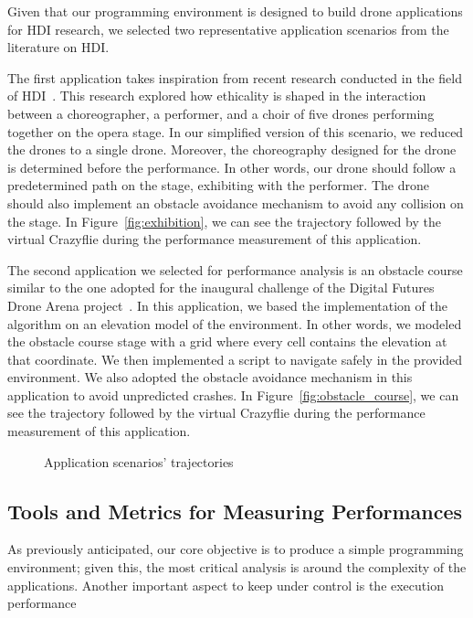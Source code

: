Given that our programming environment is designed to build drone applications for HDI research, we selected two representative application scenarios from the literature on HDI.

The first application takes inspiration from recent research conducted in the field of HDI~\cite{eriksson2020ethicsInMovement}. 
This research explored how ethicality is shaped in the interaction between a choreographer, a performer, and a choir of five drones performing together on the opera stage.
In our simplified version of this scenario, we reduced the drones to a single drone. 
Moreover, the choreography designed for the drone is determined before the performance.
In other words, our drone should follow a predetermined path on the stage, exhibiting with the performer. 
The drone should also implement an obstacle avoidance mechanism to avoid any collision on the stage.
In Figure~\ref{fig:exhibition}, we can see the trajectory followed by the virtual Crazyflie during the performance measurement of this application.

The second application we selected for performance analysis is an obstacle course similar to the one adopted for the inaugural challenge of the Digital Futures Drone Arena project~\cite{dronearenaChallenge}.
In this application, we based the implementation of the algorithm on an elevation model of the environment. 
In other words, we modeled the obstacle course stage with a grid where every cell contains the elevation at that coordinate.
We then implemented a script to navigate safely in the provided environment. 
We also adopted the obstacle avoidance mechanism in this application to avoid unpredicted crashes.
In Figure~\ref{fig:obstacle_course}, we can see the trajectory followed by the virtual Crazyflie during the performance measurement of this application.

\begin{figure}[t]
    \centering
    \quad
    \caption{Application scenarios' trajectories}\label{fig:application_traj}
\end{figure}

\subsection{Tools and Metrics for Measuring Performances}\label{subsec:performance_metrics}
As previously anticipated, our core objective is to produce a simple programming environment; given this, the most critical analysis is around the complexity of the applications.
Another important aspect to keep under control is the execution performance 

